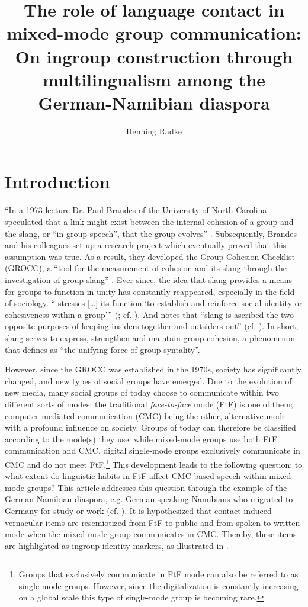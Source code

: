 \documentclass[output=paper]{langsci/langscibook}
\author{Henning Radke\affiliation{Universiteit van Amsterdam}}
\title[The role of language contact in mixed-mode group communication]
      {The role of language contact in mixed-mode group communication: On ingroup construction through multilingualism among the German-Namibian diaspora}
\begin{document}
\maketitle 


 
\section{Introduction}
\label{sec:radke:1}

“In a 1973 lecture Dr. Paul Brandes of the University of North Carolina speculated that a link might exist between the internal cohesion of a group and the slang, or “in-group speech”, that the group evolves” \citep[55]{weinberg_measurement_1979}. Subsequently, Brandes and his colleagues set up a research project which eventually proved that this assumption was true. As a result, they developed the Group Cohesion Checklist (GROCC), a “tool for the measurement of cohesion and its slang through the investigation of group slang” \citep[55]{weinberg_measurement_1979}. Ever since, the idea that slang provides a means for groups to function in unity has constantly reappeared, especially in the field of sociology. “\citet{eble_slang_1996} stresses […] its function ‘to establish and reinforce social identity or cohesiveness within a group’” (\citealt[4]{fasola_slang_2011}; cf. \citealt[11]{eble_slang_1996}). And \citet[32]{mattiello_introduction_2008} notes that “slang is ascribed the two opposite purposes of keeping insiders together and outsiders out” (cf. \citealt[4]{fasola_slang_2011}). In short, slang serves to express, strengthen and maintain group cohesion, a phenomenon that \citet[55]{weinberg_measurement_1979} defines as “the unifying force of group syntality”.

However, since the GROCC was established in the 1970s, society has significantly changed, and new types of social groups have emerged. Due to the evolution of new media, many social groups of today choose to communicate within two different sorts of modes: the traditional \textit{face-to-face} mode (FtF) is one of them; computer-mediated communication (CMC) being the other, alternative mode with a profound influence on society. Groups of today can therefore be classified according to the mode(s) they use: while mixed-mode groups use both FtF communication and CMC, digital single-mode groups exclusively communicate in CMC and do not meet FtF.\footnote{Groups that exclusively communicate in FtF mode can also be referred to as single-mode groups. However, since the digitalization is constantly increasing on a global scale this type of single-mode group is becoming rare.}  This development leads to the following question: to what extent do linguistic habits in FtF affect CMC-based speech within mixed-mode groups? This article addresses this question through the example of the German-Namibian diaspora, e.g. German-speaking Namibians who migrated to Germany for study or work (cf. \citealt{radke_urban_inpress}). It is hypothesized that contact-induced vernacular items are resemiotized from FtF to public and from spoken to written mode when the mixed-mode group communicates in CMC. Thereby, these items are highlighted as ingroup identity markers, as illustrated in .
 
\end{document}
